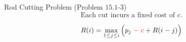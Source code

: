 \begin{frame}{}
  \begin{exampleblock}{Rod Cutting Problem (Problem $15.1$-$3$)}
    \[
      \text{Each cut incurs a fixed cost of } c.
    \]
  \end{exampleblock}

  \pause
  \[
    R(i) = \max_{1 \le j \le i} \Big(p_j \;\textcolor{red}{ -\; c} + R(i-j)\Big)
  \]
\end{frame}

% 
